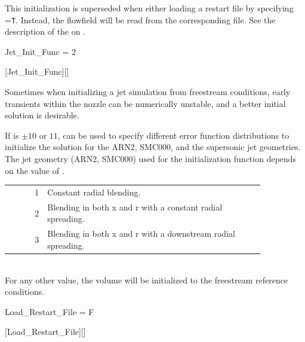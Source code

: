 \begin{nmldescbody}
\NOTE
This initialization is superseded when either loading a restart file by
specifying
=\texttt{T}.
%
Instead, the flowfield will be read from the corresponding file.
%
See the description of the
on \pageref{key:InitializationSequence}.

\end{nmldescbody}


\begin{nmldescitem}
Jet_Init_Func = 2
\end{nmldescitem}
[Jet\_Init\_Func][]

\begin{nmldescbody}
Sometimes when initializing a jet simulation from freestream conditions,
early transients within the nozzle can be numerically unstable,
and a better initial solution is desirable.

If 
is $\pm 10$ or $11$,  can be used to
specify different error function distributions to initialize the
solution for the ARN2, SMC000, and the supersonic jet geometries.
%
The jet geometry (\forexample ARN2, SMC000\cite{Bridges_2011}) used for the
initialization function depends on the value of .

\begin{tabular}{ @{} r @{ = } p{0.85\linewidth} @{} }
  1 & Constant radial blending. \\
  2 & Blending in both x and r with a constant radial spreading. \\
  3 & Blending in both x and r with a downstream radial spreading.
\end{tabular}
\\
For any other value, the volume will be initialized to the
freestream reference conditions.

\end{nmldescbody}


\begin{nmldescitem}
Load_Restart_File = F
\end{nmldescitem}
[Load\_Restart\_File][]

